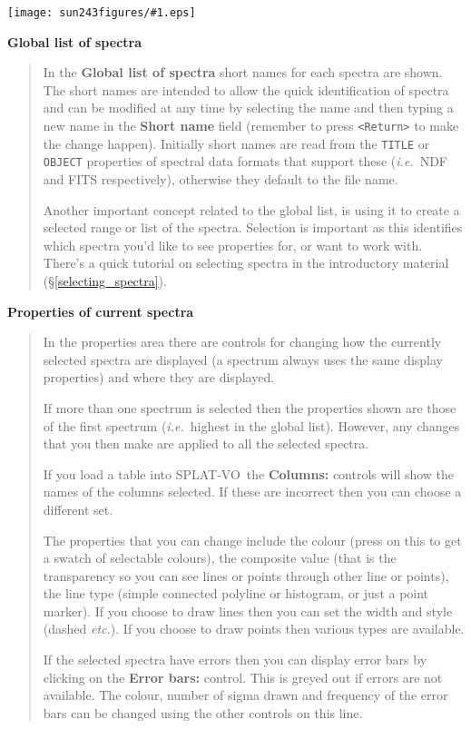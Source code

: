 \documentclass[twoside,11pt]{article}
\newcommand{\htmladdimg}[1]{}
\newcommand{\htmlref}[2]{#1}
\newcommand{\latex}[1]{#1}
\newcommand{\latexhtml}[2]{#1}
\renewcommand{\_}{\texttt{\symbol{95}}}
\newcommand{\SPLAT}{\textsf{SPLAT-VO}}
\newcommand{\mainfigure}[1]
{\begin{center}
 \latexhtml{\texttt{[image: sun243\_figures/\#1.eps]}}{\htmladdimg{#1.gif}}
 \end{center}
}
\newcommand{\labelitem}[1]{\textbf{#1}}
\newcommand{\hitext}[1]{\texttt{#1}}
\newcommand{\ie}{\textit{i.e.}}
\newcommand{\etc}{\textit{etc.}}
\newcommand{\subheading}[1]{\textbf{\large{#1}}}
\begin{document}
\mainfigure{browser5}

\subheading{Global list of spectra}
\begin{quote}
 In the \labelitem{Global list of spectra} short names for each
 spectra are shown. The short names are intended to allow the quick
 identification of spectra and can be modified at any time by
 selecting the name and then typing a new name in the
 \labelitem{Short name} field (remember to press \hitext{<Return>} to
 make the change happen). Initially short names are read from the
 \hitext{TITLE} or \hitext{OBJECT} properties of spectral data formats
 that support these (\ie\ NDF and FITS respectively), otherwise they
 default to the file name.

 Another important concept related to the global list, is using it to
 create a selected range or list of the spectra. Selection is
 important as this identifies which spectra you'd like to see
 properties for, or want to work with. There's a quick tutorial on
 \htmlref{selecting spectra}{selecting_spectra} in the introductory material
 \latex{(\S\ref{selecting_spectra})}.
\end{quote}

\subheading{Properties of current spectra}
\begin{quote}
 In the properties area there are controls for changing how the currently
 selected spectra are displayed (a spectrum always uses the same display
 properties) and where they are displayed.

 If more than one spectrum is selected then the properties shown are those of
 the first spectrum (\ie\ highest in the global list). However, any changes
 that you then make are applied to all the selected spectra.

 If you load a table into \SPLAT\ the \labelitem{Columns:} controls will show
 the names of the columns selected. If these are incorrect then you can choose
 a different set.

 The properties that you can change include the colour (press on this to get a
 swatch of selectable colours), the composite value (that is the transparency
 so you can see lines or points through other line or points), the line type
 (simple connected polyline or histogram, or just a point marker). If you
 choose to draw lines then you can set the width and style (dashed \etc). If
 you choose to draw points then various types are available.

 If the selected spectra have errors then you can display error bars by
 clicking on the \labelitem{Error bars:} control. This is greyed out if errors
 are not available. The colour, number of sigma drawn and frequency of the
 error bars can be changed using the other controls on this line.

\end{quote}
\end{document}
